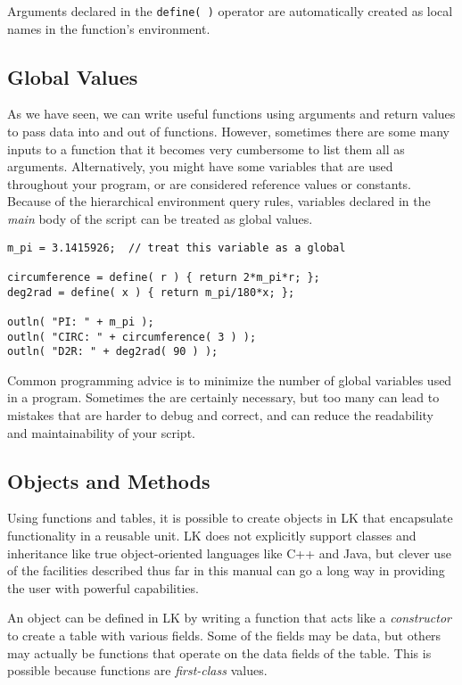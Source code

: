 \documentclass{article}
\begin{document}
Arguments declared in the \texttt{define( )} operator are automatically created as local names in the function's environment.

\subsection{Global Values}
As we have seen, we can write useful functions using arguments and return values to pass data into and out of functions.  However, sometimes there are some many inputs to a function that it becomes very cumbersome to list them all as arguments.  Alternatively, you might have some variables that are used throughout your program, or are considered reference values or constants.  Because of the hierarchical environment query rules, variables declared in the \emph{main} body of the script can be treated as global values.

\begin{verbatim}
m_pi = 3.1415926;  // treat this variable as a global

circumference = define( r ) { return 2*m_pi*r; };
deg2rad = define( x ) { return m_pi/180*x; };

outln( "PI: " + m_pi );
outln( "CIRC: " + circumference( 3 ) );
outln( "D2R: " + deg2rad( 90 ) );
\end{verbatim}

Common programming advice is to minimize the number of global variables used in a program.  Sometimes the are certainly necessary, but too many can lead to mistakes that are harder to debug and correct, and can reduce the readability and maintainability of your script.

\subsection{Objects and Methods}

Using functions and tables, it is possible to create objects in LK that encapsulate functionality in a reusable unit.  LK does not explicitly support classes and inheritance like true object-oriented languages like C++ and Java, but clever use of the facilities described thus far in this manual can go a long way in providing the user with powerful capabilities.

An object can be defined in LK by writing a function that acts like a \emph{constructor} to create a table with various fields.  Some of the fields may be data, but others may actually be functions that operate on the data fields of the table.  This is possible because functions are \emph{first-class} values.
\end{document}
